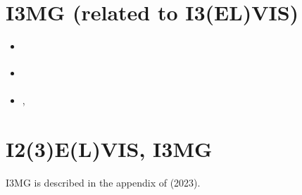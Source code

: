 

\section{I3MG (related to I3(EL)VIS)}

\begin{small}
\begin{itemize}
\item[\twothousandfourteen] \textcite{facc14}
\item[\twothousandsixteen]  \textcite{chff16}
\item[\twothousandnineteen] \textcite{stff19}, \textcite{fefs19}
\end{itemize}
\end{small}

\section{I2(3)E(L)VIS, I3MG}  

I3MG is described in the appendix of \textcite{fava23} (2023).

